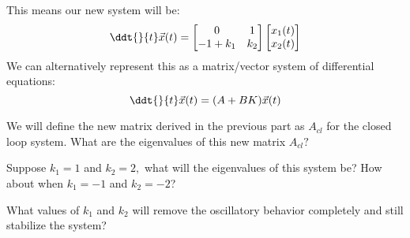 \begin{enumerate}[resume]
{  This means our new system will be:
  \begin{equation}
    \ddt{}{t} \vec{x}(t) =
    \begin{bmatrix}
    0 & 1 \\
    -1 + k_1 & k_2
    \end{bmatrix}
    \begin{bmatrix} x_1(t) \\ x_2(t) \end{bmatrix}
  \end{equation}
  We can alternatively represent this as a matrix/vector system of differential equations:
  \begin{equation}
    \ddt{}{t} \vec{x}(t) = (A + BK) \vec{x}(t)
  \end{equation}
}

\qitem We will define the new matrix derived in the previous part as $A_{cl}$ for the closed loop system.
What are the eigenvalues of this new matrix $A_{cl}?$

\ws{
\vspace{125px}
}



\qitem Suppose $k_1 = 1$ and $k_2 = 2,$ what will the eigenvalues of this system be?
How about when $k_1 = -1$ and $k_2 = -2$?

\ws{
\vspace{125px}
}



\qitem What values of $k_1$ and $k_2$ will remove the oscillatory behavior completely and still stabilize the system?


\end{enumerate}
